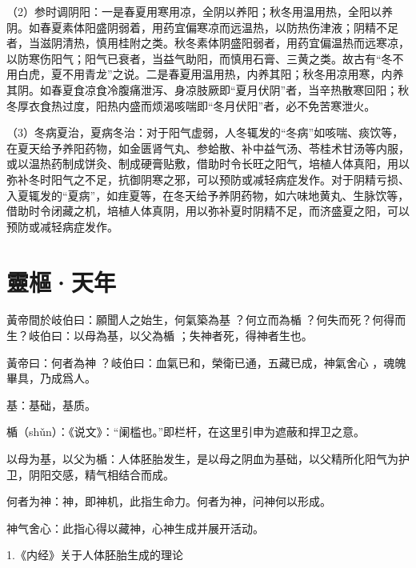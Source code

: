 \documentclass[draft,12pt]{ctexbook}
\begin{document}
（2）参时调阴阳：一是春夏用寒用凉，全阴以养阳；秋冬用温用热，全阳以养阴。如春夏素体阳盛阴弱着，用药宜偏寒凉而远温热，以防热伤津液；阴精不足者，当滋阴清热，慎用桂附之类。秋冬素体阴盛阳弱者，用药宜偏温热而远寒凉，以防寒伤阳气；阳气已衰者，当益气助阳，而慎用石膏、三黄之类。故古有“冬不用白虎，夏不用青龙”之说。二是春夏用温用热，内养其阳；秋冬用凉用寒，内养其阴。如春夏食凉食冷腹痛泄泻、身凉肢厥即“夏月伏阴”者，当辛热散寒回阳；秋冬厚衣食热过度，阳热内盛而烦渴咳喘即“冬月伏阳”者，必不免苦寒泄火。

（3）冬病夏治，夏病冬治：对于阳气虚弱，人冬辄发的“冬病”如咳喘、痰饮等，在夏天给予养阳药物，如金匮肾气丸、参蛤散、补中益气汤、苓桂术甘汤等内服，或以温热药制成饼灸、制成硬膏贴敷，借助时令长旺之阳气，培植人体真阳，用以弥补冬时阳气之不足，抗御阴寒之邪，可以预防或减轻病症发作。对于阴精亏损、入夏辄发的“夏病”，如疰夏等，在冬天给予养阴药物，如六味地黄丸、生脉饮等，借助时令闭藏之机，培植人体真阴，用以弥补夏时阴精不足，而济盛夏之阳，可以预防或减轻病症发作。

\section{靈樞·天年}%


\begin{yuanwen}
黃帝間於岐伯曰：願聞人之始生，何氣築為基 ？何立而為楯 ？何失而死？何得而生？岐伯曰：以母為基，以父為楯 ；失神者死，得神者生也。

黃帝曰：何者為神 ？岐伯曰：血氣已和，榮衛已通，五藏已成，神氣舍心 ，魂魄畢具，乃成爲人。
\end{yuanwen}


\begin{jiaozhu}
  \item 基：基础，基质。
  \item 楯（shǔn）：《说文》：“阑槛也。”即栏杆，在这里引申为遮蔽和捍卫之意。
  \item 以母为基，以父为楯：人体胚胎发生，是以母之阴血为基础，以父精所化阳气为护卫，阴阳交感，精气相结合而成。
  \item 何者为神：神，即神机，此指生命力。何者为神，问神何以形成。
  \item 神气舍心：此指心得以藏神，心神生成并展开活动。
\end{jiaozhu}


1.《内经》关于人体胚胎生成的理论
\end{document}

